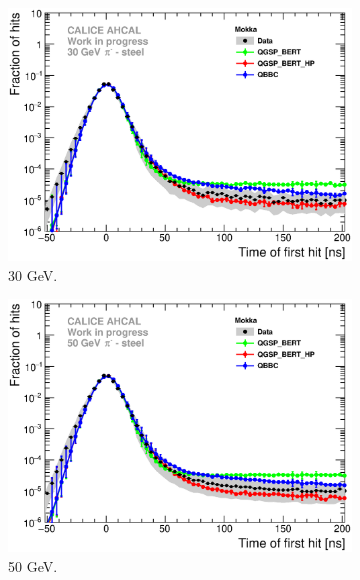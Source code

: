 \begin{figure}[htbp!]
  \begin{subfigure}[t]{0.49\textwidth}
    \centering
    \includegraphics[width=1\textwidth]{../Thesis_Plots/Timing/Pions/Plots/ComparisonToSim/Comparison_SimData_Pion30GeV_LateClusters.eps}
    \caption{30 GeV.}\label{fig:dNdt_SimData_30GeV}
  \end{subfigure}
  \hfill
  \begin{subfigure}[t]{0.49\textwidth}
    \centering
    \includegraphics[width=1\textwidth]{../Thesis_Plots/Timing/Pions/Plots/ComparisonToSim/Comparison_SimData_Pion50GeV_LateClusters.eps}
    \caption{50 GeV.} \label{fig:dNdt_SimData_50GeV}
  \end{subfigure}
  \hfill
  \begin{subfigure}[t]{0.49\textwidth}

\end{subfigure}
\end{figure}
